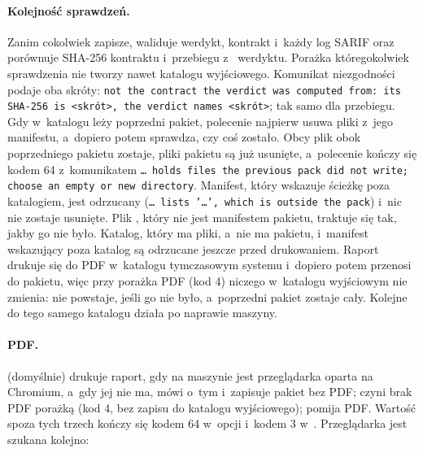 \paragraph{Kolejność sprawdzeń.} Zanim cokolwiek zapisze,  waliduje
werdykt, kontrakt i~każdy log SARIF oraz porównuje SHA-256 kontraktu i~przebiegu
z~ werdyktu. Porażka któregokolwiek sprawdzenia nie tworzy nawet katalogu
wyjściowego. Komunikat niezgodności podaje oba skróty: \texttt{not the contract the verdict
was computed from: its SHA-256 is <skrót>, the verdict names <skrót>}; tak samo dla
przebiegu. Gdy w~katalogu leży poprzedni pakiet, polecenie najpierw usuwa pliki z~jego
manifestu, a~dopiero potem sprawdza, czy coś zostało. Obcy plik obok poprzedniego pakietu
zostaje, pliki pakietu są już usunięte, a~polecenie kończy się kodem 64 z~komunikatem
\texttt{… holds files the previous pack did not write; choose an empty or new directory}.
Manifest, który wskazuje ścieżkę poza katalogiem, jest odrzucany (\texttt{… lists '…',
which is outside the pack}) i~nic nie zostaje usunięte. Plik , który
nie jest manifestem pakietu, traktuje się tak, jakby go nie było. Katalog, który ma pliki,
a~nie ma pakietu, i~manifest wskazujący poza katalog są odrzucane jeszcze przed drukowaniem.
Raport drukuje się do PDF w~katalogu tymczasowym systemu i~dopiero potem przenosi do pakietu,
więc przy  porażka PDF (kod 4) niczego w~katalogu wyjściowym nie
zmienia: nie powstaje, jeśli go nie było, a~poprzedni pakiet zostaje cały. Kolejne
 do tego samego katalogu działa po naprawie maszyny.

\paragraph{PDF.}  (domyślnie) drukuje raport, gdy na maszynie jest
przeglądarka oparta na Chromium, a~gdy jej nie ma, mówi o~tym i~zapisuje pakiet bez PDF;
 czyni brak PDF porażką (kod 4, bez zapisu do katalogu wyjściowego);
 pomija PDF.
Wartość spoza tych trzech kończy się kodem 64 w~opcji i~kodem 3 w~.
Przeglądarka jest szukana kolejno:

